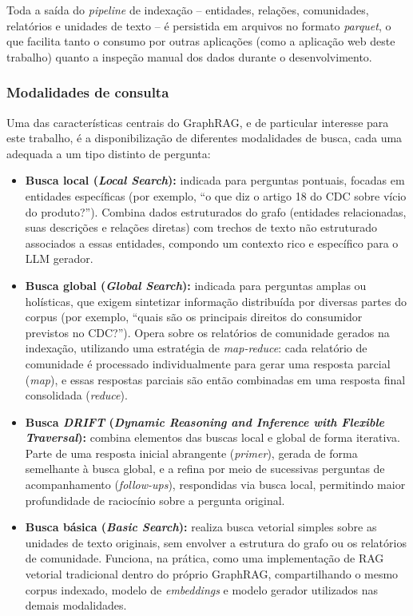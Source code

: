 Toda a saída do \textit{pipeline} de indexação -- entidades, relações,
comunidades, relatórios e unidades de texto -- é persistida em arquivos no
formato \textit{parquet}, o que facilita tanto o consumo por outras aplicações
(como a aplicação web deste trabalho) quanto a inspeção manual dos dados
durante o desenvolvimento.

\subsubsection{Modalidades de consulta}
\label{sec-fundteo-graphrag-consultas}

Uma das características centrais do GraphRAG, e de particular interesse para
este trabalho, é a disponibilização de diferentes modalidades de busca, cada
uma adequada a um tipo distinto de pergunta:

\begin{itemize}
    \item \textbf{Busca local (\textit{Local Search}):} indicada para
    perguntas pontuais, focadas em entidades específicas (por exemplo, ``o
    que diz o artigo 18 do CDC sobre vício do produto?''). Combina dados
    estruturados do grafo (entidades relacionadas, suas descrições e relações
    diretas) com trechos de texto não estruturado associados a essas
    entidades, compondo um contexto rico e específico para o LLM gerador.

    \item \textbf{Busca global (\textit{Global Search}):} indicada para
    perguntas amplas ou holísticas, que exigem sintetizar informação
    distribuída por diversas partes do corpus (por exemplo, ``quais são os
    principais direitos do consumidor previstos no CDC?''). Opera sobre os
    relatórios de comunidade gerados na indexação, utilizando uma estratégia
    de \textit{map-reduce}: cada relatório de comunidade é processado
    individualmente para gerar uma resposta parcial (\textit{map}), e essas
    respostas parciais são então combinadas em uma resposta final consolidada
    (\textit{reduce}).

    \item \textbf{Busca \textit{DRIFT} (\textit{Dynamic Reasoning and
    Inference with Flexible Traversal}):} combina elementos das buscas local
    e global de forma iterativa. Parte de uma resposta inicial abrangente
    (\textit{primer}), gerada de forma semelhante à busca global, e a refina
    por meio de sucessivas perguntas de acompanhamento (\textit{follow-ups}),
    respondidas via busca local, permitindo maior profundidade de raciocínio
    sobre a pergunta original.

    \item \textbf{Busca básica (\textit{Basic Search}):} realiza busca
    vetorial simples sobre as unidades de texto originais, sem envolver a
    estrutura do grafo ou os relatórios de comunidade. Funciona, na prática,
    como uma implementação de RAG vetorial tradicional dentro do próprio
    GraphRAG, compartilhando o mesmo corpus indexado, modelo de
    \textit{embeddings} e modelo gerador utilizados nas demais modalidades.
\end{itemize}

